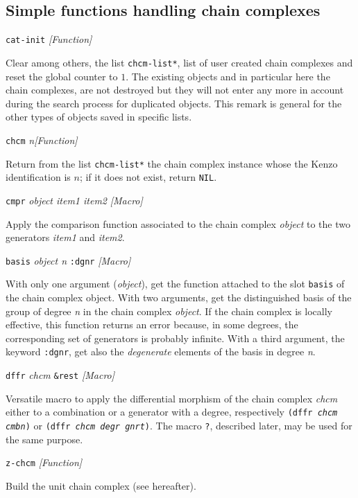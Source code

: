 \subsection {Simple functions handling chain complexes}

{\parindent=0mm
{\leftskip=5mm
{\tt cat-init} \hfill {\em [Function]} \par}
{\leftskip=15mm
Clear among others, the list {\tt *chcm-list*}, list of user created chain complexes  and reset
the global counter to $1$. The existing objects and in particular here the chain complexes,
are not destroyed but they will not enter any more in account during the search process for duplicated
objects. This remark is general for the other types of objects saved in specific lists.   \par}
{\leftskip=5mm
{\tt chcm} {\em n}\hfill {\em [Function]} \par}
{\leftskip=15mm
Return from the list {\tt *chcm-list*} the chain complex instance whose the Kenzo identification is $n$;
if it does not exist, return {\tt NIL}. \par}
{\leftskip=5mm
{\tt cmpr} {\em object item1 item2} \hfill {\em [Macro]} \par}
{\leftskip=15mm
Apply the comparison function associated to the chain complex {\em object} to the two generators
{\em item1} and {\em item2}.  \par}
{\leftskip=5mm
{\tt basis} {\em object n} {\tt :dgnr} \hfill {\em [Macro]} \par}
{\leftskip=15mm
With only one argument ({\em object}), get the  function attached to the slot {\tt basis} of the chain complex object.
With two arguments,
get the distinguished basis of the group of degree {\em n} in the chain complex {\em object}.
If the chain complex is locally effective,
this function returns an error because, in some degrees, the corresponding set of generators is
probably infinite. With a third argument, the keyword {\tt :dgnr},  get also the {\em degenerate}
elements of the basis in degree {\em n}.\par}
{\leftskip=5mm
{\tt dffr} {\em chcm} {\tt \&rest} \hfill {\em [Macro]} \par}
{\leftskip=15mm
Versatile macro to apply the differential morphism of the chain complex {\em chcm} either to a combination or
a generator with a degree, respectively {\tt (dffr {\em chcm cmbn})} or
{\tt (dffr {\em chcm degr gnrt})}. The macro {\tt ?}, described later, may be used for the same purpose. \par}
{\leftskip=5mm
{\tt z-chcm} \hfill {\em [Function]} \par}
{\leftskip=15mm
Build the unit chain complex (see hereafter). \par}
}
